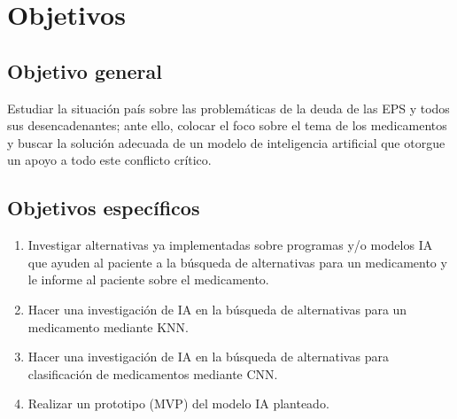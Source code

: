 \section{Objetivos}

\subsection{Objetivo general}
Estudiar la situación país sobre las problemáticas de la deuda de las EPS y todos sus desencadenantes; ante ello, colocar el foco sobre el tema de los medicamentos y buscar la solución adecuada de un modelo de inteligencia artificial que otorgue un apoyo a todo este conflicto crítico.

\subsection{Objetivos específicos}
\begin{enumerate}
	\item Investigar alternativas ya implementadas sobre programas y/o modelos IA que ayuden al paciente a la búsqueda de alternativas para un medicamento y le informe al paciente sobre el medicamento.
	
	\item Hacer una investigación de IA en la búsqueda de alternativas para un medicamento mediante KNN.
	
	\item Hacer una investigación de IA en la búsqueda de alternativas para clasificación de medicamentos mediante CNN.
	
	\item Realizar un prototipo (MVP) del modelo IA planteado.
\end{enumerate}

\pagebreak